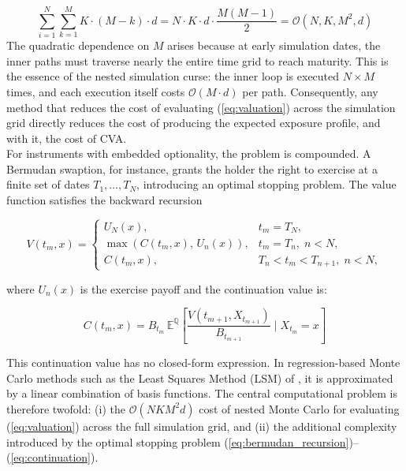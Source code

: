     \begin{equation}\label{eq:total_sim}
    \sum_{i=1}^{N} \sum_{k=1}^{M} K \cdot (M - k) \cdot d
    = N \cdot K \cdot d \cdot \frac{M(M-1)}{2}
    = \mathcal{O}(N , K , M^2 , d)
    \end{equation}
    \noindent
    The quadratic dependence on $M$ arises because at early simulation dates, the inner paths must traverse nearly the entire time grid to reach maturity. This is the essence of the nested simulation curse: the inner loop is executed $N \times M$ times, and each execution itself costs $\mathcal{O}(M \cdot d)$ per path. Consequently, any method that reduces the cost of evaluating (\ref{eq:valuation}) across the simulation grid directly reduces the cost of producing the expected exposure profile, and with it, the cost of CVA.\\

    \noindent
    For instruments with embedded optionality, the problem is compounded. A Bermudan swaption, for instance, grants the holder the right to exercise at a finite set of dates ${T_1, \ldots, T_N}$, introducing an optimal stopping problem. The value function satisfies the backward recursion \cite{oosterlee2019mathematical}
        
    \begin{equation}\label{eq:bermudan_recursion}
        V(t_m, x) = \begin{cases}
        U_N(x), & t_m = T_N, \\
        \max(C(t_m, x),\, U_n(x)), & t_m = T_n,\; n < N, \\
        C(t_m, x), & T_n < t_m < T_{n+1},\; n < N,
      \end{cases}
    \end{equation}
     
     \noindent
      where $U_n(x)$ is the exercise payoff and the continuation value is:
    
      \begin{equation}\label{eq:continuation}
      C(t_m, x) = B_{t_m} \, \mathbb{E}^{\mathbb{Q}} \left[ \frac{V(t_{m+1}, X_{t_{m+1}})}{B_{t_{m+1}}} \;\Big|\; X_{t_m} = x \right]
      \end{equation}
        
    \noindent
    This continuation value has no closed-form expression. In regression-based Monte Carlo methods such as the Least Squares Method (LSM) of \cite{longstaff2001valuing}, it is approximated by a linear combination of basis functions. The central computational problem is therefore twofold: (i) the $\mathcal{O}(N K M^2 d)$ cost of nested Monte Carlo for evaluating (\ref{eq:valuation}) across the full simulation grid, and
    (ii) the additional complexity introduced by the optimal stopping problem (\ref{eq:bermudan_recursion})--(\ref{eq:continuation}).
    
